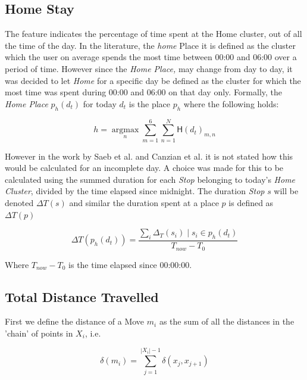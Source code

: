 \subsection{Home Stay}
The  feature indicates the percentage of time spent at the Home cluster, out of all the time of the day. In the literature, the \textit{home} Place it is defined as the cluster which the user on average spends the most time between 00:00 and 06:00 over a period of time. However since the \textit{Home Place,} may change from day to day, it was decided to let \textit{Home} for a specific day be defined as the cluster for which the most time was spent during 00:00 and 06:00 on that day only. Formally, the \textit{Home Place} $p_h (d_t)$ for today $d_t$ is the place $p_h$ where the following holds:

\begin{equation}
\label{eq:feature-home-place}
h = \operatorname*{argmax}_n \sum_{m=1}^{6} \sum_{n=1}^{N}  \mathsf{H}(d_t)_{m,n}
\end{equation}

However in the work by Saeb et al. \cite{Saeb2015} and Canzian et al.\cite{Canzian2015} it is not stated how this would be calculated for an incomplete day. A choice was made for this to be calculated using the summed duration for each \textit{Stop} belonging to today's \textit{Home Cluster}, divided by the time elapsed since midnight. The duration \textit{Stop} $s$ will be denoted $\Delta T (s)$ and similar the duration spent at a place $p$ is defined as $\Delta T (p)$

\begin{equation}
\label{eq:feature-home-place}
\Delta T(p_{h} (d_t) )= \frac{\sum_i \Delta_T (s_i) \;|\; s_i \in p_h (d_t)}{T_{now} - T_{0}}
\end{equation}

Where $T_{now} - T_0$ is the time elapsed since 00:00:00.

\subsection{Total Distance Travelled}
First we define the distance of a Move $m_i$ as the sum of all the distances in the 'chain' of points in $X_i$, i.e.

\begin{equation}
\label{eq:feature-move-computation}
\delta (m_i)  = \sum_{j=1}^{|X_i|-1} \delta (x_j, x_{j+1})
\end{equation}


